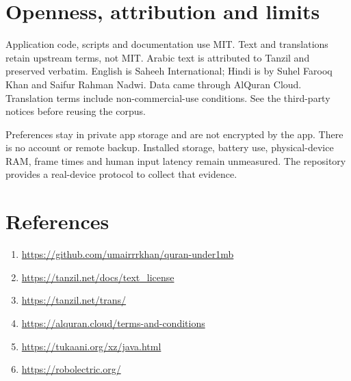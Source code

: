 \documentclass[11pt,a4paper]{article}
\begin{document}
\section{Openness, attribution and limits}
Application code, scripts and documentation use MIT. Text and translations
retain upstream terms, not MIT. Arabic text is attributed to Tanzil and
preserved verbatim. English is Saheeh International; Hindi is by Suhel
Farooq Khan and Saifur Rahman Nadwi. Data came through AlQuran Cloud.
Translation terms include non-commercial-use conditions. See the
third-party notices before reusing the corpus.

Preferences stay in private app storage and are not encrypted by the app.
There is no account or remote backup. Installed storage, battery use,
physical-device RAM, frame times and human input latency remain unmeasured.
The repository provides a real-device protocol to collect that evidence.
\section*{References}
\begin{enumerate}
\item \url{https://github.com/umairrrkhan/quran-under1mb}
\item \url{https://tanzil.net/docs/text_license}
\item \url{https://tanzil.net/trans/}
\item \url{https://alquran.cloud/terms-and-conditions}
\item \url{https://tukaani.org/xz/java.html}
\item \url{https://robolectric.org/}
\end{enumerate}
\end{document}
